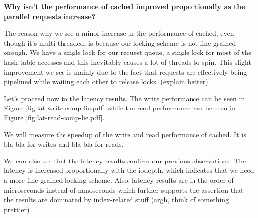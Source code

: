 \textbf{Why isn't the performance of cached improved proportionally as the 
	parallel requests increase?}

The reason why we see a minor increase in the performance of cached, even 
though it's multi-threaded, is because our locking scheme is not fine-grained 
enough. We have a single lock for our request queue, a single lock for most of 
the hash table accesses and this inevitably causes a lot of threads to spin.  
This slight improvement we see is mainly due to the fact that requests are 
effectively being pipelined while waiting each other to release locks. (explain 
better)

Let's proceed now to the latency results. The write performance can be seen in 
Figure \ref{fig:lat-write-comp-lie.pdf} while the read performance can be seen 
in Figure \ref{fig:lat-read-comp-lie.pdf}.


We will measure the speedup of the write and read performance of cached. It is 
bla-bla for writes and bla-bla for reads.

We can also see that the latency results confirm our previous observations. The 
latency is increased proportionally with the iodepth, which indicates that we 
need a more fine-grained locking scheme. Also, latency results are in the order 
of microseconds instead of nanoseconds which further supports the assertion 
that the results are dominated by index-related stuff (argh, think of something 
prettier)
